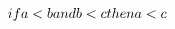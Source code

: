 \documentclass[preview]{standalone}
\begin{document}
\begin{center}
$if a < b \vspace{2cm}  and  \vspace{2cm} b < c \vspace{2cm} then \vspace{2cm} a < c$
\end{center}
\end{document}
